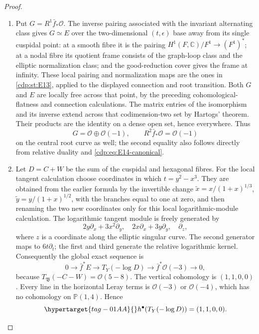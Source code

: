 \begin{proof}
\begin{enumerate}[label=\arabic*.,leftmargin=*]
\item Put $G=R^1\bar f_*\mathcal O$. The inverse pairing associated with the invariant alternating
class gives $G\simeq E$ over the two-dimensional $(t,\epsilon)$
base away from its single cuspidal point: at a smooth fibre it is the pairing
$H^1(F,\mathbb C)/F^1\to(F^1)^*$; at a nodal fibre its quotient
frame consists of the graph-loop class and the elliptic normalization
class; and the good-reduction cover gives the frame at infinity.
These local pairing and normalization maps are the ones in
\ref{cdp:st:E13}, applied to the displayed connection and root transition. Both $G$ and $E$ are locally free across that point, by the
preceding cohomological-flatness and connection calculations.
The matrix entries of the isomorphism and its inverse extend
across that codimension-two set by Hartogs' theorem. Their products
are the identity on a dense open set, hence everywhere. Thus
\[
 G=\mathcal O\oplus\mathcal O(-1),\qquad
 R^2\bar f_*\mathcal O=\mathcal O(-1)
\]
on the central root curve as well; the second equality also follows
directly from relative duality and \eqref{cdp:eq:E14-canonical}.

\item Let $D=C+W$ be the sum of the cuspidal and hexagonal fibres.
For the local tangent calculation choose coordinates in which
$t=y^2-x^3$. They are obtained from the earlier formula by the
invertible change $\widetilde x=x/(1+x)^{1/3}$,
$\widetilde y=y/(1+x)^{1/2}$, with the branches equal to one at
zero, and then renaming the two new coordinates only for this local
logarithmic-module calculation. The logarithmic
tangent module is freely generated by
\[
 2y\partial_x+3x^2\partial_y,\quad
 2x\partial_x+3y\partial_y,\quad\partial_z,
\]
where $z$ is a coordinate along the elliptic singular curve. The
second generator maps to $6t\partial_t$;
the first and third generate the relative logarithmic kernel.
Consequently the global exact sequence is
\[
 0\longrightarrow\bar f^*E\longrightarrow T_Y(-\log D)
 \longrightarrow\bar f^*\mathcal O(-3)\longrightarrow0,
\]
because $T_{\mathfrak B}(-C-W)=\mathcal O(5-8)$.
The vertical cohomology is $(1,1,0,0)$. Every line in the
horizontal Leray terms is $\mathcal O(-3)$ or $\mathcal O(-4)$,
which has no cohomology on $\mathbb P(1,4)$. Hence
\begin{equation}\hypertarget{tag-01AA}{}\label{cdp:eq:E14-log-coho}
 h^\bullet(T_Y(-\log D))=(1,1,0,0).
\end{equation}


\end{enumerate}
\end{proof}
